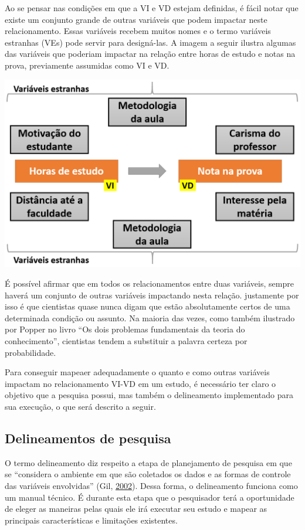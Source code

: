 \documentclass[
]{book}
\begin{document}
Ao se pensar nas condições em que a VI e VD estejam definidas, é fácil
notar que existe um conjunto grande de outras variáveis que podem
impactar neste relacionamento. Essas variáveis recebem muitos nomes e o
termo variáveis estranhas (VEs) pode servir para designá-las. A imagem a
seguir ilustra algumas das variáveis que poderiam impactar na relação
entre horas de estudo e notas na prova, previamente assumidas como VI e
VD.

\includegraphics{./img/cap_variavel_estranha.png}

É possível afirmar que em todos os relacionamentos entre duas variáveis,
sempre haverá um conjunto de outras variáveis impactando nesta relação.
justamente por isso é que cientistas quase nunca digam que estão
absolutamente certos de uma determinada condição ou assunto. Na maioria
das vezes, como também ilustrado por Popper no livro ``Os dois problemas
fundamentais da teoria do conhecimento'', cientistas tendem a substituir
a palavra certeza por probabilidade.

Para conseguir mapeaer adequadamente o quanto e como outras variáveis
impactam no relacionamento VI-VD em um estudo, é necessário ter claro o
objetivo que a pesquisa possui, mas também o delineamento implementado
para sua execução, o que será descrito a seguir.

\hypertarget{delineamentos-de-pesquisa}{%
\subsection{Delineamentos de pesquisa}\label{delineamentos-de-pesquisa}}

O termo delineamento diz respeito a etapa de planejamento de pesquisa em
que se ``considera o ambiente em que são coletados os dados e as formas
de controle das variáveis envolvidas'' (Gil,
\protect\hyperlink{ref-gil2002}{2002}). Dessa forma, o delineamento
funciona como um manual técnico. É durante esta etapa que o pesquisador
terá a oportunidade de eleger as maneiras pelas quais ele irá executar
seu estudo e mapear as principais características e limitações
existentes.
\end{document}
